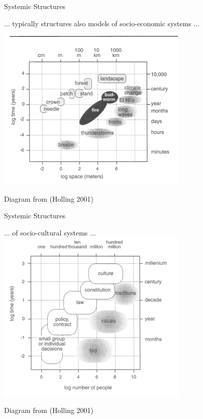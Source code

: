 \documentclass{beamer}
\begin{document}
\begin{frame}{Systemic Structures}

  ... typically structures also models of socio-economic systems ...
  \begin{center}
    \includegraphics[width=.6\textwidth]{Bilder/Holling-1.png}

    Diagram from (Holling 2001)
  \end{center}
\end{frame}

\begin{frame}{Systemic Structures}
  \begin{center}

    ... of socio-cultural systems ... 
    \includegraphics[width=.6\textwidth]{Bilder/Holling-2.png}

    Diagram from (Holling 2001)
  \end{center}
\end{frame}
\end{document}
